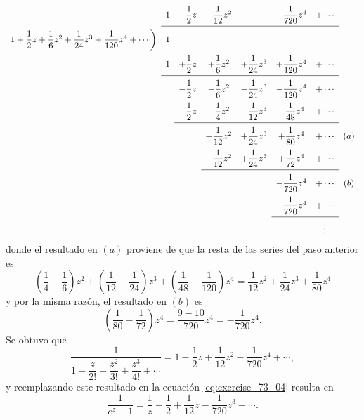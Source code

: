 \documentclass[a4paper]{report}
\begin{document}
\[
\setlength\extrarowheight{10pt}
\begin{array}[t]{cccccccc}
                       & 1  & -\dfrac{1}{2}z & +\dfrac{1}{12}z^2 & & -\dfrac{1}{720}z^4 & +\cdots&\\[\medskipamount]
\cline{2-7}
1+\dfrac{1}{2}z+\dfrac{1}{6}z^2+\dfrac{1}{24}z^3+ \dfrac{1}{120}z^4+\cdots\bigg)  
                       & 1  & &  &  &  &\\
                       & 1  & +\dfrac{1}{2}z & +\dfrac{1}{6}z^2 & +\dfrac{1}{24}z^3 & +\dfrac{1}{120}z^4 & +\cdots&\\[\medskipamount]
\cline{2-7}
                       &    & -\dfrac{1}{2}z & -\dfrac{1}{6}z^2 & -\dfrac{1}{24}z^3 & -\dfrac{1}{120}z^4 & +\cdots&\\
                       &    & -\dfrac{1}{2}z & -\dfrac{1}{4}z^2 & -\dfrac{1}{12}z^3 & -\dfrac{1}{48}z^4 & +\cdots&\\[\medskipamount]
\cline{3-7}
                       &    &                & +\dfrac{1}{12}z^2 & +\dfrac{1}{24}z^3 & +\dfrac{1}{80}z^4 & +\cdots&(a)\\
                       &    &                & +\dfrac{1}{12}z^2 & +\dfrac{1}{24}z^3 & +\dfrac{1}{72}z^4 & +\cdots&\\[\medskipamount]
\cline{4-7}
                       &    &                &                   &                   & -\dfrac{1}{720}z^4 & +\cdots&(b)\\
                       &    &                &                   &                   & -\dfrac{1}{720}z^4 & +\cdots&\\[\medskipamount]
\cline{6-7}
                       &    &                &                   &                   &  & \vdots&
\end{array}
\]
donde el resultado en \((a)\) proviene de que la resta de las series del paso anterior es
\[
 \left(\frac{1}{4}-\frac{1}{6}\right)z^2+\left(\frac{1}{12}-\frac{1}{24}\right)z^3+\left(\frac{1}{48}-\frac{1}{120}\right)z^4=\frac{1}{12}z^2+\dfrac{1}{24}z^3+\dfrac{1}{80}z^4
\]
y por la misma razón, el resultado en \((b)\) es
\[
 \left(\frac{1}{80}-\frac{1}{72}\right)z^4=\frac{9-10}{720}z^4=-\frac{1}{720}z^4.
\]
Se obtuvo que 
\[
 \dfrac{1}{1+\dfrac{z}{2!}+\dfrac{z^2}{3!}+\dfrac{z^3}{4!}+\cdots}=1-\frac{1}{2}z+\frac{1}{12}z^2-\frac{1}{720}z^4+\cdots,
\]
y reemplazando este resultado en la ecuación \ref{eq:exercise_73_04} resulta en
\[
 \frac{1}{e^z-1}=\frac{1}{z}-\frac{1}{2}+\frac{1}{12}z-\frac{1}{720}z^3+\cdots.
\]
\end{document}
